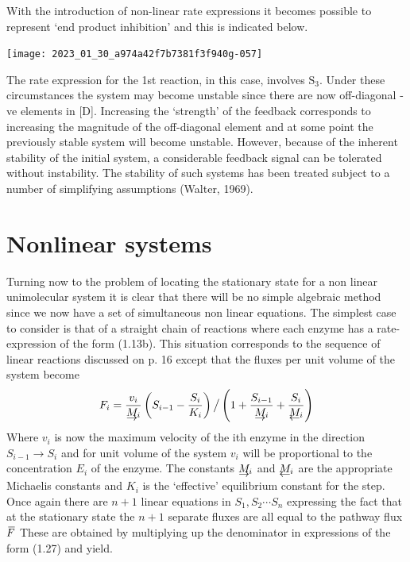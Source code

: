 With the introduction of non-linear rate expressions it becomes possible to represent `end product inhibition' and this is indicated below.

\begin{center}
\texttt{[image: 2023\_01\_30\_a974a42f7b7381f3f940g-057]}
\end{center}

The rate expression for the 1st reaction, in this case, involves $\mathrm{S}_{3}$. Under these circumstances the system may become unstable since there are now off-diagonal -ve elements in [D]. Increasing the `strength' of the feedback corresponds to increasing the magnitude of the off-diagonal element and at some point the previously stable system will become unstable. However, because of the inherent stability of the initial system, a considerable feedback signal can be tolerated without instability. The stability of such systems has been treated subject to a number of simplifying assumptions (Walter, 1969).

\section{Nonlinear systems}

Turning now to the problem of locating the stationary state for a non linear unimolecular system it is clear that there will be no simple algebraic method since we now have a set of simultaneous non linear equations. The simplest case to consider is that of a straight chain of reactions where each enzyme has a rate-expression of the form (1.13b). This situation corresponds to the sequence of linear reactions discussed on p. 16 except that the fluxes per unit volume of the system become
%
\begin{equation}
F_{i} = \frac{v_{i}}{\vecur{M_{i}}}\left(S_{i-1} - \frac{S_{i}}{K_{i}}\right) \big/ \left(1 + \frac{S_{i-1}}{\vecur{M_{i}}} + \frac{S_{i}}{\vecul{M_i}}\right)
\label{eqn:127}
\end{equation}
%
Where $v_{i}$ is now the maximum velocity of the ith enzyme in the direction $S_{i-1} \rightarrow S_{i}$ and for unit volume of the system $v_{i}$ will be proportional to the concentration $E_{i}$ of the enzyme. The constants $\vecur{M_{i}}$ and $\vecul{M_{i}}$ are the appropriate Michaelis constants and $K_{i}$ is the `effective' equilibrium constant for the step. Once again there are $n+1$ linear equations in $S_{1}, S_{2} \cdots S_{n}$ expressing the fact that at the stationary state the $n+1$ separate fluxes are all equal to the pathway flux $\,\overline{\!{F}}$ These are obtained by multiplying up the denominator in expressions of the form (1.27) and yield.

